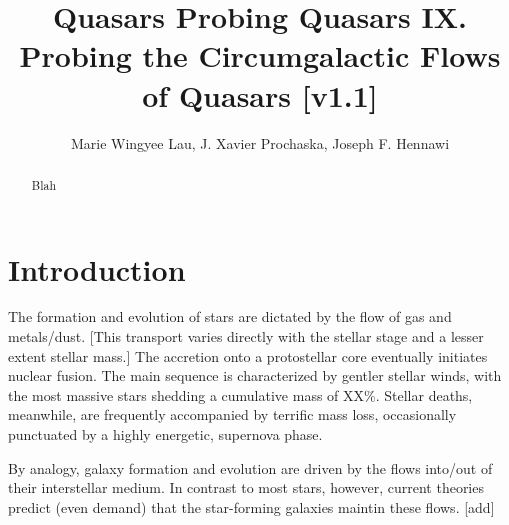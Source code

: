 \documentclass[iop]{emulateapj}
\begin{document}
\title{Quasars Probing Quasars IX. Probing the Circumgalactic Flows of Quasars [v1.1]}

\author{Marie Wingyee Lau, J. Xavier Prochaska, 
Joseph F. Hennawi
}

\begin{abstract}
Blah
\end{abstract}



\section{Introduction}



The formation and evolution of stars are dictated
by the flow of gas and metals/dust.  [This transport
varies directly with the stellar stage
and a lesser extent stellar mass.]
The accretion onto a protostellar  core eventually
initiates nuclear fusion.  The main sequence is characterized
by gentler stellar winds, with the most massive
stars shedding a cumulative mass of XX\%.
Stellar deaths, meanwhile, are frequently accompanied by terrific
mass loss, occasionally punctuated by a highly energetic,
supernova phase.

By analogy, galaxy formation and evolution are driven by the
flows into/out of their interstellar medium.
In contrast to most stars, however, current theories
predict (even demand) that the star-forming galaxies
maintin these flows. [add]
\end{document}
